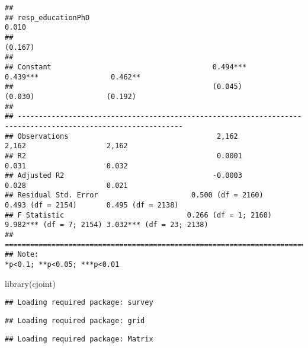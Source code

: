 \documentclass[
]{article}
\newenvironment{Shaded}{\begin{snugshade}}{\end{snugshade}}
\newcommand{\FunctionTok}[1]{\textcolor[rgb]{0.00,0.00,0.00}{#1}}
\newcommand{\NormalTok}[1]{#1}
\begin{document}
\begin{verbatim}
##                                                                                                              
## resp_educationPhD                                                                             0.010          
##                                                                                              (0.167)         
##                                                                                                              
## Constant                                      0.494***              0.439***                 0.462**         
##                                               (0.045)                (0.030)                 (0.192)         
##                                                                                                              
## -------------------------------------------------------------------------------------------------------------
## Observations                                   2,162                  2,162                   2,162          
## R2                                             0.0001                 0.031                   0.032          
## Adjusted R2                                   -0.0003                 0.028                   0.021          
## Residual Std. Error                      0.500 (df = 2160)      0.493 (df = 2154)       0.495 (df = 2138)    
## F Statistic                             0.266 (df = 1; 2160) 9.982*** (df = 7; 2154) 3.032*** (df = 23; 2138)
## =============================================================================================================
## Note:                                                                             *p<0.1; **p<0.05; ***p<0.01
\end{verbatim}

\begin{Shaded}
\begin{Highlighting}[]
\FunctionTok{library}\NormalTok{(cjoint)}
\end{Highlighting}
\end{Shaded}

\begin{verbatim}
## Loading required package: survey
\end{verbatim}

\begin{verbatim}
## Loading required package: grid
\end{verbatim}

\begin{verbatim}
## Loading required package: Matrix
\end{verbatim}
\end{document}
